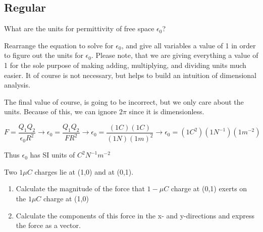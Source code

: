 

\subsection*{Regular}

\begin{question}
What are the units for permittivity of free space $\epsilon_0$?

\end{question}

\begin{solution}

Rearrange the equation to solve for $\epsilon_0$, and give all variables a value of 1 in order to figure out the units for $\epsilon_0$. Please note, that we are giving everything a value of 1 for the sole purpose of making adding, multiplying, and dividing units much easier. It of course is not necessary, but helps to build an intuition of dimensional analysis.

The final value of course, is going to be incorrect, but we only care about the units. Because of this, we can ignore $2\pi$ since it is dimensionless.

\begin{equation*}
F = \frac{Q_1Q_2}{\epsilon_0R^2} \rightarrow
\epsilon_0 = \frac{Q_1Q_2}{FR^2} \rightarrow
\epsilon_0 = \frac{(1C)(1C)}{(1N)(1m)^2} \rightarrow
\epsilon_0 = (1C^2)(1N^{-1})(1m^{-2})
\end{equation*}

Thus $\epsilon_0$ has SI units of $C^2N^{-1}m^{-2}$
\end{solution}


\begin{question}
Two $1\mu C$ charges lie at (1,0) and at (0,1).
\begin{enumerate}[label=(\alph*)]
    \item Calculate the magnitude of the force that $1-\mu C$ charge at (0,1) exerts on the $1\mu C$ charge at (1,0)
    \item Calculate the components of this force in the x- and y-directions and express the force as a vector.
\end{enumerate}
\end{question}


